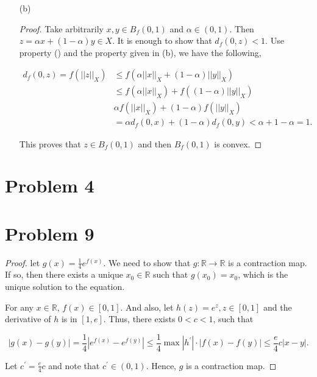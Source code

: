 \documentclass[12pt]{article}
\begin{document}
\begin{enumerate}
\begin{proof}
In conclusion, $(X, d_f)$ is a complete metric space.

\end{proof}

\item [(b)]

\begin{proof}

Take arbitrarily $x, y\in B_f(0, 1)$ and $\alpha\in(0, 1)$. Then $z = \alpha x + (1- \alpha)y\in X$. It is enough to show that $d_f(0, z) < 1$. Use property () and the property given in (b), we have the following,

$$
\begin{aligned}
d_f(0, z) = f(||z||_X) & \leqslant f(\alpha||x||_X + (1-\alpha)||y||_X) \\
& \leqslant f(\alpha||x||_X) + f((1-\alpha)||y||_X) \\
& \alpha f(||x||_X) + (1-\alpha)f(||y||_X)\\
& = \alpha d_f(0, x) + (1-\alpha) d_f(0, y) < \alpha + 1 - \alpha = 1.
\end{aligned}
$$ 

This proves that $z \in B_f(0,1)$ and then $B_f(0, 1)$ is convex.


\end{proof}


\end{enumerate}


\section*{Problem 4}


\vspace{60mm}


\section*{Problem 9}

\begin{proof}

let $g(x) = \frac{1}{4} e^{f(x)}$. We need to show that $g: \mathbb{R} \rightarrow \mathbb{R}$ is a contraction map. If so, then there exists a unique $x_0\in\mathbb{R}$ such that $g(x_0) = x_0$, which is the unique solution to the equation.

For any $x\in \mathbb{R}$, $f(x) \in [0, 1]$. And also, let $h(z) = e^z, z\in [0, 1]$ and the derivative of $h$ is in $[1, e]$. Thus, there exists $0<c<1$, such that

$$
|g(x) - g(y)| = \frac{1}{4}|e^{f(x)} - e^{f(y)}| \leqslant \frac{1}{4}\max |h^\prime|\cdot |f(x) - f(y)| \leqslant \frac{e}{4}c|x-y|.
$$

Let $c^\prime = \frac{e}{4}c$ and note that $c^\prime \in (0, 1)$. Hence, $g$ is a contraction map.


\end{proof}
\end{document}
